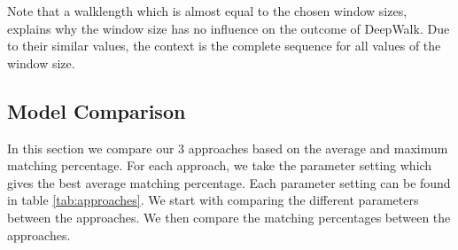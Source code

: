 Note that a walklength which is almost equal to the chosen window sizes, explains why the window size has no influence on the outcome of DeepWalk. Due to their similar values, the context is the complete sequence for all values of the window size.


\subsection{Model Comparison}

In this section we compare our $3$ approaches based on the average and maximum matching percentage. For each approach, we take the parameter setting which gives the best average matching percentage. Each parameter setting can be found in table \ref{tab:approaches}. We start with comparing the different parameters between the approaches. We then compare the matching percentages between the approaches. 

